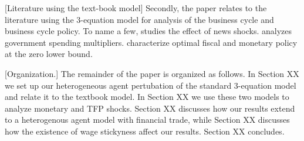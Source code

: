 [Literature using the text-book model]
Secondly, the paper relates to the literature using the 3-equation model for analysis of the business cycle and business cycle policy. To name a few, \citet{Lorenzoni2009} studies the effect of news shocks. \citet{Christiano2011} analyzes government spending multipliers. \citet{Werning2012} characterize optimal fiscal and monetary policy at the zero lower bound. 

[Organization.] The remainder of the paper is organized as follows. In Section XX we set up our heterogeneous agent pertubation of the standard 3-equation model and relate it to the textbook model. In Section XX we use these two models to analyze monetary and TFP shocks. Section XX discusses how our results extend to a heterogenous agent model with financial trade, while Section XX discusses how the existence of wage stickyness affect our results. Section XX concludes. 